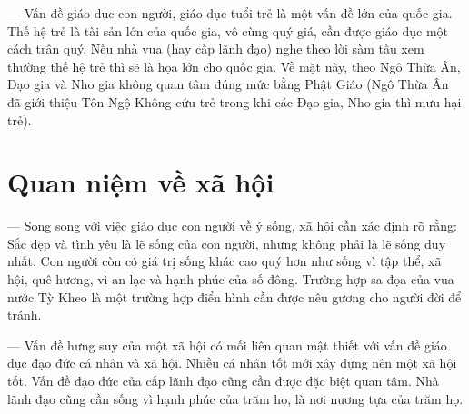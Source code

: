 --- Vấn đề giáo dục con người, giáo dục tuổi trẻ là một vấn đề lớn của quốc gia. Thế hệ trẻ là tài sản lớn của quốc gia, vô cùng quý giá, cần được giáo dục một cách trân quý. Nếu nhà vua (hay cấp lãnh đạo) nghe theo lời sàm tấu xem thường thế hệ trẻ thì sẽ là họa lớn cho quốc gia. Về mặt này, theo Ngô Thừa Ân, Đạo gia và Nho gia không quan tâm đúng mức bằng Phật Giáo (Ngô Thừa Ân đã giới thiệu Tôn Ngộ Không cứu trẻ trong khi các Đạo gia, Nho gia thì mưu hại trẻ).

\section{Quan niệm về xã hội} %
\label{sec:78_79_xa_hoi}

--- Song song với việc giáo dục con người về ý sống, xã hội cần xác định rõ rằng: Sắc đẹp và tình yêu là lẽ sống của con người, nhưng không phải là lẽ sống duy nhất. Con người còn có giá trị sống khác cao quý hơn như sống vì tập thể, xã hội, quê hương, vì an lạc và hạnh phúc của số đông. Trường hợp sa đọa của vua nước Tỳ Kheo là một trường hợp điển hình cần được nêu gương cho người đời để tránh.

--- Vấn đề hưng suy của một xã hội có mối liên quan mật thiết với vấn đề giáo dục đạo đức cá nhân và xã hội. Nhiều cá nhân tốt mới xây dựng nên một xã hội tốt. Vấn đề đạo đức của cấp lãnh đạo cũng cần được đặc biệt quan tâm. Nhà lãnh đạo cũng cần sống vì hạnh phúc của trăm họ, là nơi nương tựa của trăm họ.
